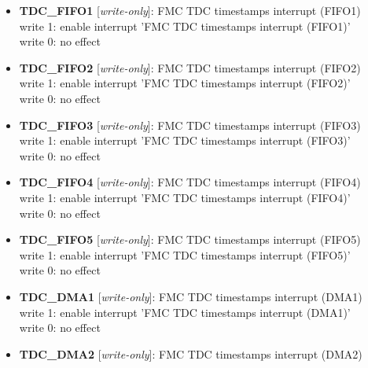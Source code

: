 \begin{itemize}
\item \begin{small}
{\bf 
TDC\_FIFO1
} [\emph{write-only}]: FMC TDC timestamps interrupt (FIFO1)
\\
write 1: enable interrupt 'FMC TDC timestamps interrupt (FIFO1)'\\write 0: no effect
\end{small}
\item \begin{small}
{\bf 
TDC\_FIFO2
} [\emph{write-only}]: FMC TDC timestamps interrupt (FIFO2)
\\
write 1: enable interrupt 'FMC TDC timestamps interrupt (FIFO2)'\\write 0: no effect
\end{small}
\item \begin{small}
{\bf 
TDC\_FIFO3
} [\emph{write-only}]: FMC TDC timestamps interrupt (FIFO3)
\\
write 1: enable interrupt 'FMC TDC timestamps interrupt (FIFO3)'\\write 0: no effect
\end{small}
\item \begin{small}
{\bf 
TDC\_FIFO4
} [\emph{write-only}]: FMC TDC timestamps interrupt (FIFO4)
\\
write 1: enable interrupt 'FMC TDC timestamps interrupt (FIFO4)'\\write 0: no effect
\end{small}
\item \begin{small}
{\bf 
TDC\_FIFO5
} [\emph{write-only}]: FMC TDC timestamps interrupt (FIFO5)
\\
write 1: enable interrupt 'FMC TDC timestamps interrupt (FIFO5)'\\write 0: no effect
\end{small}
\item \begin{small}
{\bf 
TDC\_DMA1
} [\emph{write-only}]: FMC TDC timestamps interrupt (DMA1)
\\
write 1: enable interrupt 'FMC TDC timestamps interrupt (DMA1)'\\write 0: no effect
\end{small}
\item \begin{small}
{\bf 
TDC\_DMA2
} [\emph{write-only}]: FMC TDC timestamps interrupt (DMA2)

\end{small}
\end{itemize}
